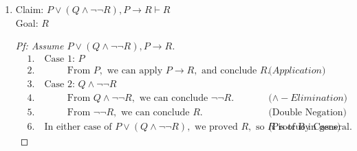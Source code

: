 \documentclass{article}
\begin{document}
\begin{enumerate}
\begin{enumerate}
        \item
        Claim: $P \lor (Q \land \neg \neg R), P \rightarrow R \vdash R$ \\
        Goal: $R$
        \begin{proof}[Pf: Assume $P \lor (Q \land \neg \neg R), P \rightarrow R$]
            \begin{align*}
                &1. \quad \text{Case 1: } P \\
                &2. \quad \hspace{1cm} \text{From } P, \text{ we can apply } P \rightarrow R, \text{ and conclude } R. && \text{($Application$)} \\
                &3. \quad \text{Case 2: } Q \land \neg \neg R \\
                &4. \quad \hspace{1cm} \text{From } Q \land \neg \neg R, \text{ we can conclude } \neg \neg R. && \text{($\land - Elimination$)} \\
                &5. \quad \hspace{1cm} \text{From } \neg \neg R, \text{ we can conclude } R. && \text{(Double Negation)} \\
                &6. \quad \text{In either case of } P \lor (Q \land \neg \neg R), \text{ we proved } R, \text{ so } R \text{ is true in general.} && \text{(Proof By Cases)}
            \end{align*}
        \end{proof}


\end{enumerate}
\end{enumerate}
\end{document}
